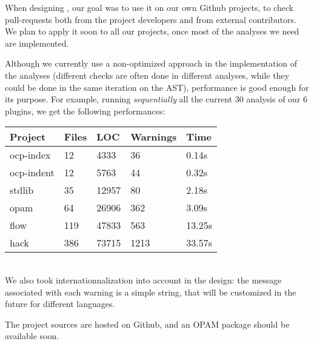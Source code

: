 When designing \ocplint{}, our goal was to use it on our own Github
projects, to check pull-requests both from the project developers and
from external contributors. We plan to apply it soon to all our
projects, once most of the analyses we need are implemented.

Although we currently use a non-optimized approach in the
implementation of the analyses (different checks are often done in
different analyses, while they could be done in the same iteration on
the AST), performance is good enough for its purpose. For example,
running \emph{sequentially} all the current 30 analysis of our 6 plugins, we
get the following performances:\\
{\small\noindent
\begin{tabular}{|l|l|l|l|l|}
  \hline
  Project & Files & LOC & Warnings & Time \\
  \hline
  ocp-index & 12 & 4333 & 36 & 0.14s \\
  \hline
  ocp-indent & 12 & 5763 & 44 & 0.32s \\
  \hline
  stdlib & 35 & 12957 & 80 & 2.18s \\
  \hline
  opam & 64 & 26906 & 362 & 3.09s \\
  \hline
  flow & 119 & 47833 & 563 & 13.25s \\
  \hline
  hack & 386 & 73715 & 1213 & 33.57s \\
  \hline
\end{tabular}}\\

We also took internationnalization into account in the design: the
message associated with each warning is a simple string, that will be
customized in the future for different languages.

The project sources are hosted on Github, and an OPAM package should
be available soon.

